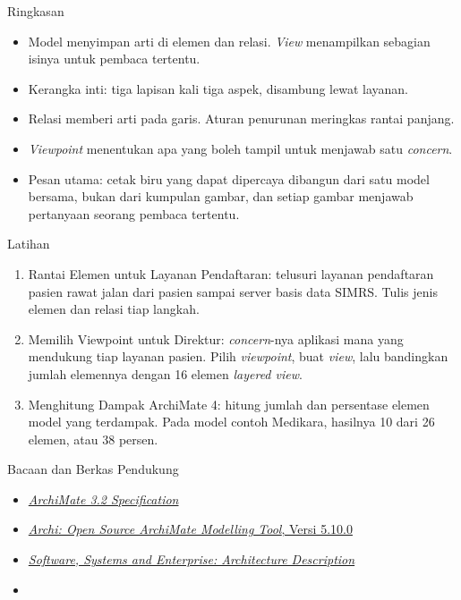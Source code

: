 \documentclass[aspectratio=169, table, 12pt]{beamer}
\begin{document}
\begin{frame}{{\Large Ringkasan}}
  \vspace{6pt}
  \small
  \begin{itemize}
    \item Model menyimpan arti di elemen dan relasi. \textit{View} menampilkan sebagian isinya untuk
          pembaca tertentu.
    \item Kerangka inti: tiga lapisan kali tiga aspek, disambung lewat layanan.
    \item Relasi memberi arti pada garis. Aturan penurunan meringkas rantai panjang.
    \item \textit{Viewpoint} menentukan apa yang boleh tampil untuk menjawab satu \textit{concern}.
    \item Pesan utama: cetak biru yang dapat dipercaya dibangun dari satu model bersama, bukan dari
          kumpulan gambar, dan setiap gambar menjawab pertanyaan seorang pembaca tertentu.
  \end{itemize}
\end{frame}

\begin{frame}{{\Large Latihan}}
  \vspace{6pt}
  \small
  \begin{enumerate}
    \item Rantai Elemen untuk Layanan Pendaftaran: telusuri layanan pendaftaran pasien rawat jalan dari
          pasien sampai server basis data SIMRS. Tulis jenis elemen dan relasi tiap langkah.
    \item Memilih Viewpoint untuk Direktur: \textit{concern}-nya aplikasi mana yang mendukung tiap layanan
          pasien. Pilih \textit{viewpoint}, buat \textit{view}, lalu bandingkan jumlah elemennya dengan
          16 elemen \textit{layered view}.
    \item Menghitung Dampak ArchiMate 4: hitung jumlah dan persentase elemen model yang terdampak. Pada
          model contoh Medikara, hasilnya 10 dari 26 elemen, atau 38 persen.
  \end{enumerate}
\end{frame}

\begin{frame}{{\Large Bacaan dan Berkas Pendukung}}
  \vspace{10pt}
  \begin{itemize}
    \item \href{https://publications.opengroup.org/standards/archimate/c226}{\textit{ArchiMate 3.2 Specification}}
    \item \href{https://www.archimatetool.com/download/}{\textit{Archi: Open Source ArchiMate Modelling Tool}, Versi 5.10.0}
    \item \href{https://www.iso.org/standard/74393.html}{\textit{Software, Systems and Enterprise: Architecture Description}}
    \item {}
  \end{itemize}
\end{frame}
\end{document}
